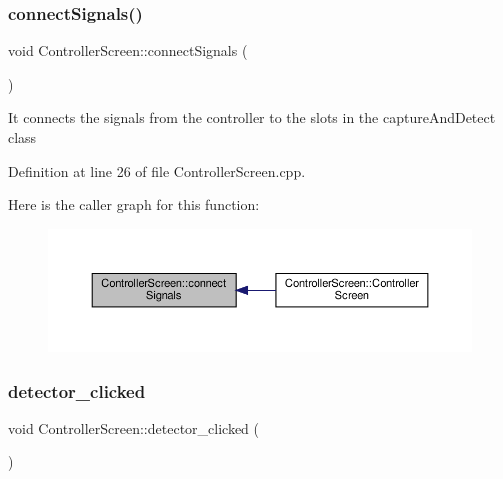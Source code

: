 \mbox{\label{class_controller_screen_af7c789ddca1dece0fb0585e84aeb5e81}} 
\subsubsection{\texorpdfstring{connect\+Signals()}{connectSignals()}}
{\footnotesize\ttfamily void Controller\+Screen\+::connect\+Signals (\begin{DoxyParamCaption}{ }\end{DoxyParamCaption})\hspace{0.3cm}{\ttfamily [private]}}

It connects the signals from the controller to the slots in the capture\+And\+Detect class 

Definition at line 26 of file Controller\+Screen.\+cpp.

Here is the caller graph for this function\+:
\nopagebreak
\begin{figure}[H]
\begin{center}
\leavevmode
\includegraphics[width=350pt]{class_controller_screen_af7c789ddca1dece0fb0585e84aeb5e81_icgraph}
\end{center}
\end{figure}
\mbox{\label{class_controller_screen_ac4f535408ffdfa10cbfa1a89d833f592}} 
\subsubsection{\texorpdfstring{detector\+\_\+clicked}{detector\_clicked}}
{\footnotesize\ttfamily void Controller\+Screen\+::detector\+\_\+clicked (\begin{DoxyParamCaption}{ }\end{DoxyParamCaption})\hspace{0.3cm}{\ttfamily [slot]}}

